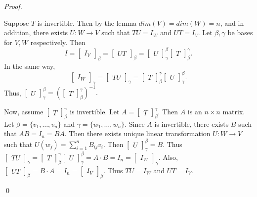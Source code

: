 \documentclass[12pt]{article}
\newenvironment{sol}
    {\emph{Proof.}
    }
    {
    \qed
    }
\begin{document}
\begin{sol}
Suppose $T$ is invertible. Then by the lemma $dim(V) = dim(W) = n$, and in addition, there exists $U : W \to V$ such that $TU = I_W$ and $UT = I_V$. Let $\beta , \gamma$ be bases for $V, W$ respectively. Then $$I = \begin{bmatrix}
I_V
\end{bmatrix}_\beta = \begin{bmatrix}
UT
\end{bmatrix}_\beta = \begin{bmatrix}
U
\end{bmatrix}_\gamma^\beta\begin{bmatrix}
T
\end{bmatrix}_\beta^\gamma.$$ In the same way, $$\begin{bmatrix}
I_W
\end{bmatrix}_\gamma = \begin{bmatrix}
TU
\end{bmatrix}_\gamma = \begin{bmatrix}
T
\end{bmatrix}_\beta^\gamma \begin{bmatrix}
U
\end{bmatrix}_\gamma^\beta.$$ Thus, $\begin{bmatrix}
U
\end{bmatrix}_\gamma^\beta = \left( \begin{bmatrix}
T
\end{bmatrix}_\beta^\gamma \right)^{-1}.$

Now, assume $\begin{bmatrix}
T
\end{bmatrix}_\beta^\gamma$ is invertible. Let $A = \begin{bmatrix}
T
\end{bmatrix}_\beta^\gamma$. Then $A$ is an $n \times n$ matrix. Let $\beta = \{v_1, \dots, v_n\}$ and $\gamma = \{w_1, \dots, w_n\}$. Since $A$ is invertible, there exists $B$ such that $AB = I_n = BA$. Then there exists unique linear transformation $U: W \to V$ such that $U(w_j) = \sum_{i = 1}^n B_{ij}v_i$. Then $\begin{bmatrix}
U
\end{bmatrix}_\gamma^\beta = B$. Thus $\begin{bmatrix}
TU
\end{bmatrix}_\gamma = \begin{bmatrix}
T
\end{bmatrix}_\beta^\gamma \begin{bmatrix}
U
\end{bmatrix}_\gamma^\beta = A \cdot B = I_n = \begin{bmatrix}
I_W
\end{bmatrix}_\gamma$. Also, $\begin{bmatrix}
UT
\end{bmatrix}_\beta = B \cdot A = I_n = \begin{bmatrix}
I_V
\end{bmatrix}_\beta$. Thus $TU = I_W$ and $UT = I_V$.
\end{sol}
\end{document}
